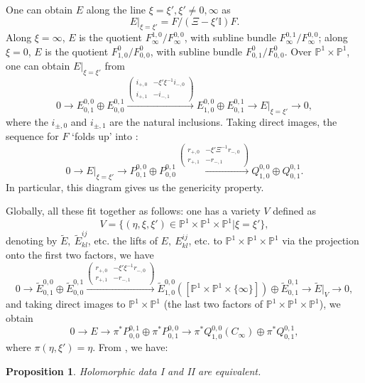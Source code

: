 \documentclass[12pt]{article}
\newtheorem{proposition}[theorem]{Proposition}
\theoremstyle{definition}
\theoremstyle{remark}
\numberwithin{theorem}{section}
\renewcommand{\i}{\mathrm{i}}
\def\bP{{\mathbb {P}}}
\def\bI{{\mathbb {I}}}
\begin{document}
One can  obtain 
$E$ along the line $\xi= \xi', \xi'\neq 0,\infty$ as 
$$E|_{\xi= \xi'} = F/ (\Xi-\xi'\bI)F.$$
Along $\xi=\infty$, $E$ is the quotient $F_\infty^{1,0}/F_\infty^{0,0}$, with subline bundle $F_\infty^{0,1}/F_\infty^{0,0}$; along $\xi=0$, $E$ is the quotient $F^0_{1,0}/F^0_{0,0}$, with subline bundle $F^0_{0,1}/F^0_{0,0}$. Over $\bP^1\times \bP^1$, one can obtain $E|_{\xi=\xi'}$ from 
\begin{equation}\label{caloron-sequence}
0\rightarrow  E^{0,0}_{0,1}\oplus E^{0,1}_{0,0} 
\xrightarrow{\begin{pmatrix}    i_{+,0}& -\xi'\xi^{-1} i_{-,0}\\i_{+,1}&-i_{-,1}\end{pmatrix}} E_{1,0}^{0,0}\oplus E_{0,1}^{0,1}\rightarrow E|_{\xi= \xi'}\rightarrow 0,
\end{equation} where the $i_{\pm,0}$ and $i_{\pm,1}$ are the natural inclusions. Taking direct images,  the sequence for $F$ `folds up' into  :
\begin{equation}\label{caloron-sequence-projected}
0\rightarrow  E|_{\xi= \xi'}\rightarrow P^{0,0}_{0,1}\oplus P^{0,1}_{0,0} \xrightarrow{\begin{pmatrix}  r_{+,0}& -\xi'\Xi^{-1}r_{-,0}\\r_{+,1}&-r_{-,1}\end{pmatrix}} Q_{1,0}^{0,0}\oplus Q_{0,1}^{0,1}.
\end{equation} 
In particular, this diagram gives us the genericity property.

Globally, all these fit together as follows: one has a variety $V$ defined as 
$$V = \{ (\eta, \xi,\xi')\in \bP^1\times \bP^1 \times \bP^1|\xi=\xi'\},$$
denoting by $\widetilde E,\ \widetilde E^{ij}_{kl}$, etc. the lifts   of $E,\ E^{ij}_{kl}$, etc. to $ \bP^1\times \bP^1 \times \bP^1$ via the projection onto the first two factors, we have
\begin{equation}\label{caloron-sequence-2}
0\rightarrow  \widetilde E^{0,0}_{0,1}\oplus \widetilde E^{0,1}_{0,0} \xrightarrow{\begin{pmatrix}r_{+,0}& -\xi'\xi^{-1}r_{-,0}\\r_{+,1}&-r_{-,1}\end{pmatrix}} \widetilde E_{1,0}^{0,0}([\bP^1 \times \bP^1\times \{\infty\}])\oplus \widetilde E_{0,1}^{0,1}\rightarrow \widetilde E|_V\rightarrow 0,
\end{equation} 
and taking direct images  to $\bP^1\times \bP^1$ (the last two factors of $\bP^1 \times \bP^1\times\bP^1$), we obtain
\begin{equation}\label{caloron-sequence-projected-2}
0\rightarrow  E \rightarrow \pi^*P_{0,0}^{0,1}\oplus \pi^*P_{0,1}^{0,0} \rightarrow \pi^*Q_{1,0}^{0,0}(C_\infty)\oplus \pi^*Q_{0,1}^{0,1},
\end{equation} 
where $\pi(\eta,\xi') = \eta$. From \cite[Theorem 7]{Charbonneau:2006gu}, we have:
\begin{proposition}  Holomorphic data I and II are equivalent.\end{proposition} 
\end{document}
